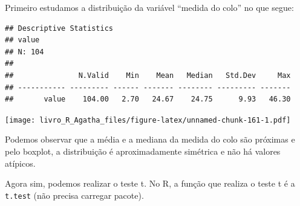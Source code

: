 \documentclass[
]{book}
\newenvironment{Shaded}{\begin{snugshade}}{\end{snugshade}}
\newcommand{\DataTypeTok}[1]{\textcolor[rgb]{0.13,0.29,0.53}{#1}}
\newcommand{\DecValTok}[1]{\textcolor[rgb]{0.00,0.00,0.81}{#1}}
\newcommand{\KeywordTok}[1]{\textcolor[rgb]{0.13,0.29,0.53}{\textbf{#1}}}
\newcommand{\NormalTok}[1]{#1}
\newcommand{\OperatorTok}[1]{\textcolor[rgb]{0.81,0.36,0.00}{\textbf{#1}}}
\newcommand{\OtherTok}[1]{\textcolor[rgb]{0.56,0.35,0.01}{#1}}
\newcommand{\StringTok}[1]{\textcolor[rgb]{0.31,0.60,0.02}{#1}}
\begin{document}
Primeiro estudamos a distribuição da variável ``medida do colo'' no que segue:

\begin{Shaded}
\end{Shaded}

\begin{verbatim}
## Descriptive Statistics  
## value  
## N: 104  
## 
##               N.Valid    Min    Mean   Median   Std.Dev     Max
## ----------- --------- ------ ------- -------- --------- -------
##       value    104.00   2.70   24.67    24.75      9.93   46.30
\end{verbatim}

\begin{Shaded}
\end{Shaded}

\texttt{[image: livro\_R\_Agatha\_files/figure-latex/unnamed-chunk-161-1.pdf]}

Podemos observar que a média e a mediana da medida do colo são próximas e pelo boxplot, a distribuição é aproximadamente simétrica e não há valores atípicos.

Agora sim, podemos realizar o teste t. No R, a função que realiza o teste t é a \texttt{t.test} (não precisa carregar pacote).

\begin{Shaded}
\end{Shaded}
\end{document}
